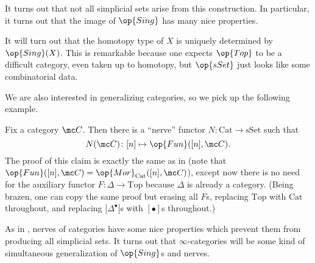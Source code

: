 \documentclass[../notes.tex]{subfiles}
\begin{document}
\begin{remark} \label{rem:more-sset-than-sing}
	It turns out that not all simplicial sets arise from this construction. In particular, it turns out that the image of $\op{Sing}$ has many nice properties. %
\end{remark}
\begin{remark}
	It will turn out that the homotopy type of $X$ is uniquely determined by $\op{Sing}(X)$. This is remarkable because one expects $\op{Top}$ to be a difficult category, even taken up to homotopy, but $\op{sSet}$ just looks like some combinatorial data.
\end{remark}
We are also interested in generalizing categories, so we pick up the following example.
\begin{example}[nerve] \label{ex:nerve}
	Fix a category $\mc C$. Then there is a ``nerve'' functor $N\colon\mathrm{Cat}\to\mathrm{sSet}$ such that
	\[N(\mc C)\colon[n]\mapsto\op{Fun}([n],\mc C).\]
	The proof of this claim is exactly the same as in  (note that $\op{Fun}([n],\mc C)=\op{Mor}_{\mathrm{Cat}}([n],\mc C)$), except now there is no need for the auxiliary functor $F\colon\Delta\to\mathrm{Top}$ because $\Delta$ is already a category. (Being brazen, one can copy the same proof but erasing all $F$s, replacing $\mathrm{Top}$ with $\mathrm{Cat}$ throughout, and replacing $\left|\Delta^\bullet\right|$s with $[\bullet]$s throughout.)
\end{example}
\begin{remark}
	As in , nerves of categories have some nice properties which prevent them from producing all simplicial sets. It turns out that $\infty$-categories will be some kind of simultaneous generalization of $\op{Sing}$s and nerves.
\end{remark}
\end{document}
